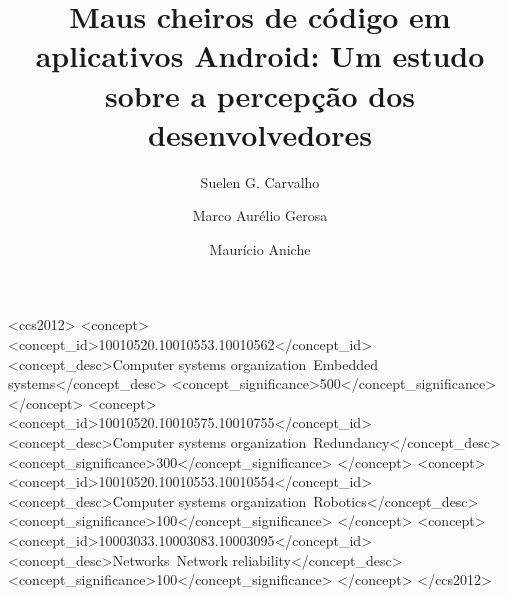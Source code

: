 \documentclass[sigconf]{acmart}
\begin{document}
\title{Maus cheiros de código em aplicativos Android: Um estudo sobre a percepção dos desenvolvedores}


\author{Suelen G. Carvalho}

\author{Marco Aurélio Gerosa}

\author{Maurício Aniche}



\begin{abstract}

\end{abstract}

%
%
\begin{CCSXML}
<ccs2012>
 <concept>
  <concept_id>10010520.10010553.10010562</concept_id>
  <concept_desc>Computer systems organization~Embedded systems</concept_desc>
  <concept_significance>500</concept_significance>
 </concept>
 <concept>
  <concept_id>10010520.10010575.10010755</concept_id>
  <concept_desc>Computer systems organization~Redundancy</concept_desc>
  <concept_significance>300</concept_significance>
 </concept>
 <concept>
  <concept_id>10010520.10010553.10010554</concept_id>
  <concept_desc>Computer systems organization~Robotics</concept_desc>
  <concept_significance>100</concept_significance>
 </concept>
 <concept>
  <concept_id>10003033.10003083.10003095</concept_id>
  <concept_desc>Networks~Network reliability</concept_desc>
  <concept_significance>100</concept_significance>
 </concept>
</ccs2012>  
\end{CCSXML}
\end{document}
